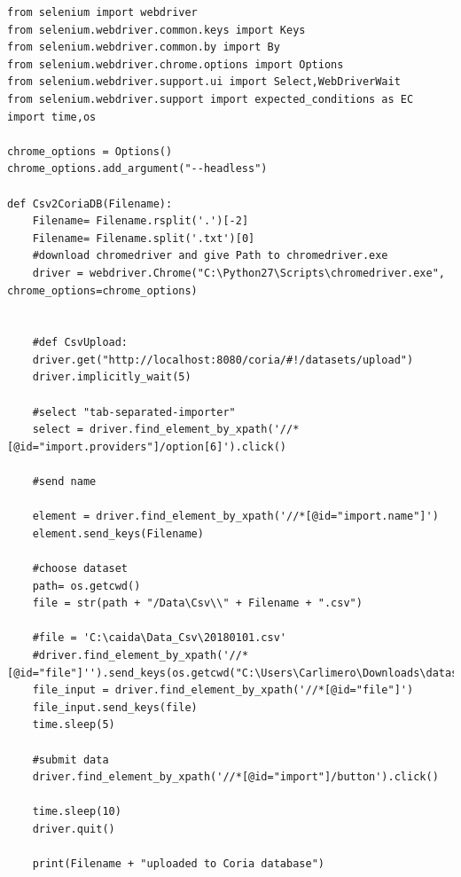 \documentclass[conference, 11pt]{IEEEtran}
\begin{document}
\begin{lstlisting}[float=*,caption={A wide listing float, single column}]
from selenium import webdriver
from selenium.webdriver.common.keys import Keys
from selenium.webdriver.common.by import By
from selenium.webdriver.chrome.options import Options
from selenium.webdriver.support.ui import Select,WebDriverWait
from selenium.webdriver.support import expected_conditions as EC
import time,os

chrome_options = Options()  
chrome_options.add_argument("--headless")  

def Csv2CoriaDB(Filename):
	Filename= Filename.rsplit('.')[-2]
	Filename= Filename.split('.txt')[0]
	#download chromedriver and give Path to chromedriver.exe
	driver = webdriver.Chrome("C:\Python27\Scripts\chromedriver.exe", chrome_options=chrome_options)


	#def CsvUpload:
	driver.get("http://localhost:8080/coria/#!/datasets/upload")
	driver.implicitly_wait(5)

	#select "tab-separated-importer"
	select = driver.find_element_by_xpath('//*[@id="import.providers"]/option[6]').click()

	#send name
	
	element = driver.find_element_by_xpath('//*[@id="import.name"]')
	element.send_keys(Filename)

	#choose dataset
	path= os.getcwd()
	file = str(path + "/Data\Csv\\" + Filename + ".csv")

	#file = 'C:\caida\Data_Csv\20180101.csv'
	#driver.find_element_by_xpath('//*[@id="file"]'').send_keys(os.getcwd("C:\Users\Carlimero\Downloads\datastructrue.txt")')
	file_input = driver.find_element_by_xpath('//*[@id="file"]')
	file_input.send_keys(file)
	time.sleep(5)

	#submit data
	driver.find_element_by_xpath('//*[@id="import"]/button').click()

	time.sleep(10)
	driver.quit()

	print(Filename + "uploaded to Coria database")
\end{lstlisting}
\end{document}
